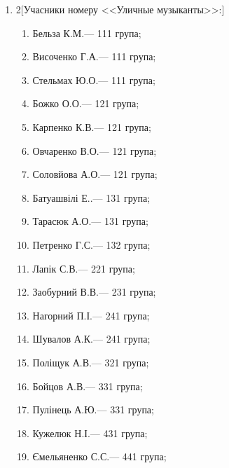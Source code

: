 \documentclass[
	a4paper,
	12pt,
	oneside,
	draft
]{extreport}
\begin{document}
\begin{enumerate}[topsep=0pt,itemsep=-1ex,partopsep=1ex,parsep=1ex]
\item 
\begin{multicols}{2}[Учасники номеру <<Уличные музыканты>>:] 
\begin{enumerate}[topsep=0pt,itemsep=-1ex,partopsep=1ex,parsep=1ex,label=\arabic*.]
\item Бельза К.М.\hfill --- 111 група;
\item Височенко Г.А.\hfill --- 111 група;
\item Стельмах Ю.О.\hfill --- 111 група;
\item Божко О.О.\hfill --- 121 група;
\item Карпенко К.В.\hfill --- 121 група;
\item Овчаренко В.О.\hfill --- 121 група;
\item Соловйова А.О.\hfill --- 121 група;
\item Батуашвілі Е..\hfill --- 131 група;
\item Тарасюк А.О.\hfill --- 131 група;
\item Петренко Г.С.\hfill --- 132 група;
\item Лапік С.В.\hfill --- 221 група;
\item Заобурний В.В.\hfill --- 231 група;
\item Нагорний П.І.\hfill --- 241 група;
\item Шувалов А.К.\hfill --- 241 група;
\item Поліщук А.В.\hfill --- 321 група;
\item Бойцов А.В.\hfill --- 331 група;
\item Пулінець А.Ю.\hfill --- 331 група;
\item Кужелюк Н.І.\hfill --- 431 група;
\item Ємельяненко С.С.\hfill --- 441 група;
\end{enumerate}
\end{multicols}


\end{enumerate}
\end{document}
